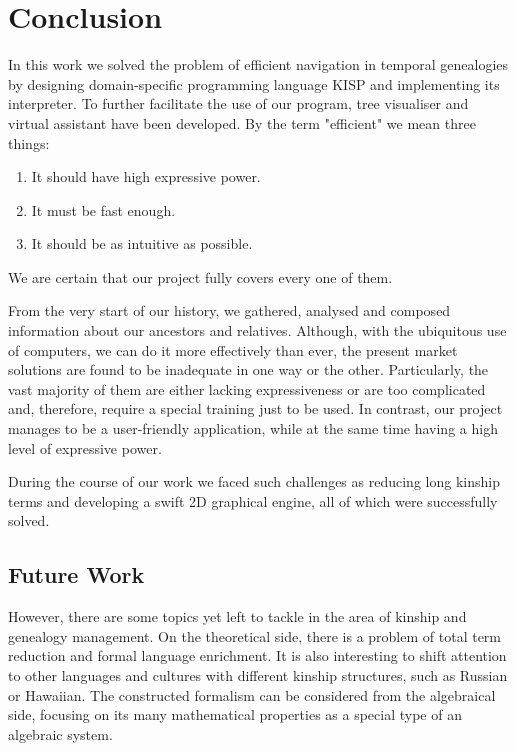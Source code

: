 \chapter{Conclusion}
\label{chap:conclusion}
In this work we solved the problem of efficient navigation in temporal genealogies by designing domain-specific programming language
KISP and implementing its interpreter. To further facilitate the use of our program, tree visualiser and virtual assistant have
been developed. By the term "efficient" we mean three things:
\begin{enumerate}
    \item{It should have high expressive power.}
    \item{It must be fast enough.}
    \item{It should be as intuitive as possible.}
\end{enumerate}
We are certain that our project fully covers every one of them.

From the very start of our history, we gathered, analysed and composed information about our ancestors and relatives.
Although, with the ubiquitous use of computers, we can do it more effectively than ever, the present market solutions are
found to be inadequate in one way or the other. Particularly, the vast majority of them are either lacking expressiveness or are
too complicated and, therefore, require a special training just to be used. In contrast, our project manages to be a user-friendly
application, while at the same time having a high level of expressive power.

During the course of our work we faced such challenges as reducing long kinship terms and developing a swift 2D graphical
engine, all of which were successfully solved.

\section{Future Work}
However, there are some topics yet left to tackle in the area of kinship and genealogy management. On the theoretical side, there
is a problem of total term reduction and formal language enrichment. It is also interesting to shift attention to other languages
and cultures with different kinship structures, such as Russian or Hawaiian. The constructed formalism can be considered from the
algebraical side, focusing on its many mathematical properties as a special type of an algebraic system.

